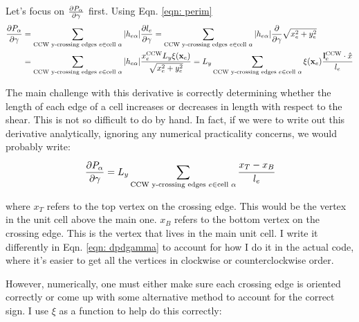 \documentclass[12pt,a4paper]{article}
\begin{document}
Let's focus on $\pdv{P_\alpha}{\gamma}$ first. Using Eqn. \ref{eqn: perim} 
\begin{align}
	\pdv{P_\alpha}{\gamma} &= \sum\limits_{\text{CCW y-crossing edges } e \in \text{cell } \alpha}|h_{e\alpha}| \pdv{l_e}{\gamma} = \sum\limits_{\text{CCW y-crossing edges } e \in \text{cell } \alpha}|h_{e\alpha}| \pdv{\gamma} \sqrt{x_e^2 + y_e^2}\\
	\label{eqn: dpdgamma}
	&= \sum\limits_{\text{CCW y-crossing edges } e \in \text{cell } \alpha}|h_{e\alpha}| \frac{x_e^{\text{CCW}} L_y \xi(\vb{x}_e)}{\sqrt{x_e^2 + y_e^2}} = L_y\sum\limits_{\text{CCW y-crossing edges } e \in \text{cell } \alpha} \xi(\vb{x}_e) \frac{\vb{l}_e^{\text{CCW}} \cdot \hat{x} }{l_e}
\end{align}

The main challenge with this derivative is correctly determining whether the length of each edge of a cell increases or decreases in length with respect to the shear. This is not so difficult to do by hand. In fact, if we were to write out this derivative analytically, ignoring any numerical practicality concerns, we would probably write:
\begin{align}
	\label{eqn: dpdgammaanalytical}
	\pdv{P_\alpha}{\gamma} = L_y\sum\limits_{\text{CCW y-crossing edges } e \in \text{cell } \alpha} \cfrac{x_T - x_B}{l_e}
\end{align}

where $x_T$ refers to the top vertex on the crossing edge. This would be the vertex in the unit cell above the main one. $x_B$ refers to the bottom vertex on the crossing edge. This is the vertex that lives in the main unit cell. I write it differently in Eqn. \ref{eqn: dpdgamma} to account for how I do it in the actual code, where it's easier to get all the vertices in clockwise or counterclockwise order. 

However, numerically, one must either make sure each crossing edge is oriented correctly or come up with some alternative method to account for the correct sign. I use $\xi$ as a function to help do this correctly:
\end{document}
